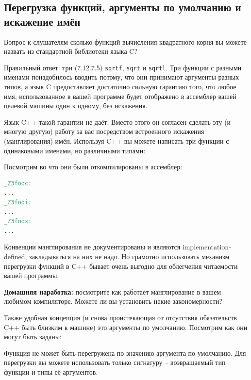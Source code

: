 \documentclass[a4paper,12pt,oneside]{article}
\begin{document}
\subsection{Перегрузка функций, аргументы по умолчанию и искажение имён}\label{NameResolution}

Вопрос к слушателям сколько функций вычисления квадратного корня вы можете назвать из стандартной библиотеки языка C?

Правильный ответ: три (7.12.7.5) \lstinline!sqrtf!, \lstinline!sqrt! и \lstinline!sqrtl!. Три функции с разными именами понадобилось вводить потому, что они принимают аргументы разных типов, а язык C предоставляет достаточно сильную гарантию того, что любое имя, использованное в вашей программе будет отображено в ассемблер вашей целевой машины один к одному, без искажения.

Язык C++ такой гарантии не даёт. Вместо этого он согласен сделать эту (и многую другую) работу за вас посредством встроенного искажения (манглирования) имён. Используя C++ вы можете написать три функции с одинаковыми именами, но различными типами:



Посмотрим во что они были откомпилированы в ассемблер:

\begin{lstlisting}[language=make]
_Z3fooc:
...
_Z3fooi:
...
_Z3foox:
...
\end{lstlisting}

Конвенции манглирования не документированы и являются implementation-defined, закладываться на них не надо. Но грамотно использовать механизм перегрузки функций в C++ бывает очень выгодно для облегчения читаемости вашей программы.

\textbf{Домашняя наработка:} посмотрите как работает манглирование в вашем любимом компиляторе. Можете ли вы установить некие закономерности?

Также удобная концепция (и снова проистекающая от отсутствия обязательств C++ быть близким к машине) это аргументы по умолчанию. Посмотрим как они могут быть заданы:



Функция не может быть перегружена по значению аргумента по умолчанию. Для перегрузки вы можете использовать только сигнатуру – возвращаемый тип функции и типы её аргументов.
\end{document}
